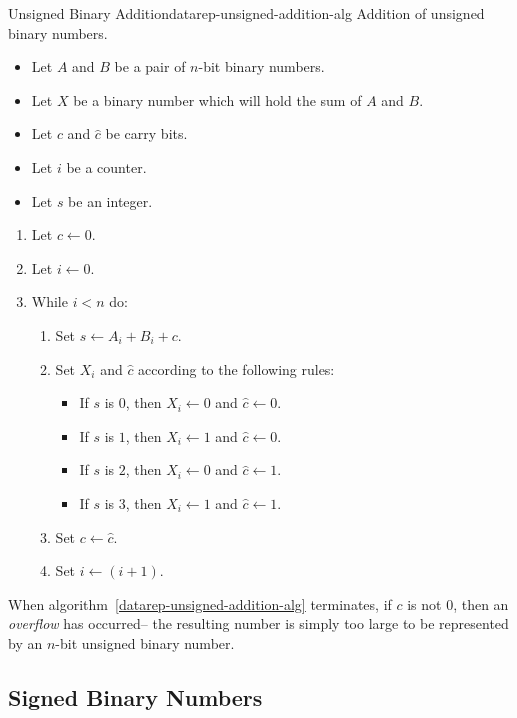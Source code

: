 \begin{algorithm}{Unsigned Binary Addition}{datarep-unsigned-addition-alg}{
        Addition of unsigned binary numbers.
}

\begin{itemize}
\item   Let $A$ and $B$ be a pair of $n$-bit binary numbers.
\item   Let $X$ be a binary number which will hold the sum of $A$ and $B$.
\item   Let $c$ and $\hat{c}$ be carry bits.
\item   Let $i$ be a counter.
\item   Let $s$ be an integer.
\end{itemize}
\begin{enumerate}
\item   Let $c \leftarrow 0$.
\item   Let $i \leftarrow 0$.
\item   While $i < n$ do:
        \begin{enumerate}
	\item	Set $s \leftarrow A_{i} + B_{i} + c$.
        \item   Set $X_{i}$ and $\hat{c}$ according to the 
		following rules:
		\begin{itemize}
		\item	If $s$ is $0$, then
			$X_{i} \leftarrow 0$ and $\hat{c} \leftarrow 0$.
		\item	If $s$ is $1$, then
			$X_{i} \leftarrow 1$ and $\hat{c} \leftarrow 0$.
		\item	If $s$ is $2$, then
			$X_{i} \leftarrow 0$ and $\hat{c} \leftarrow 1$.
		\item	If $s$ is $3$, then
			$X_{i} \leftarrow 1$ and $\hat{c} \leftarrow 1$.
		\end{itemize}
        \item   Set $c \leftarrow \hat{c}$.
        \item   Set $i \leftarrow (i + 1)$.
        \end{enumerate}
\end{enumerate}

\end{algorithm}

When algorithm~\ref{datarep-unsigned-addition-alg} terminates,
if $c$ is not 0, then an {\em overflow}
has occurred-- the resulting number is simply too large to
be represented by
an $n$-bit unsigned binary number.

\subsection{Signed Binary Numbers}

